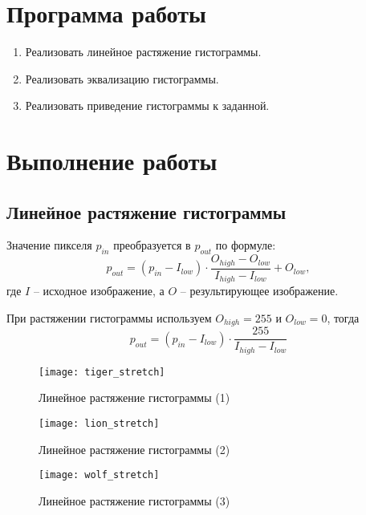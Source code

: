 





\tableofcontents
\newpage

\section{Программа работы}

\begin{enumerate}
	\item Реализовать линейное растяжение гистограммы.
	\item Реализовать эквализацию гистограммы.
	\item Реализовать приведение гистограммы к заданной.
\end{enumerate}

\section{Выполнение работы}

\subsection{Линейное растяжение гистограммы}

Значение пикселя $p_{in}$ преобразуется в $p_{out}$ по формуле:
$$
p_{out} = (p_{in} - I_{low}) \cdot \frac{O_{high} - O_{low}}{I_{high} - I_{low}} + O_{low},
$$
где $I$ -- исходное изображение, а $O$ -- результирующее изображение.

При растяжении гистограммы используем $O_{high} = 255$ и $O_{low} = 0$, тогда
$$
p_{out} = (p_{in} - I_{low}) \cdot \frac{255}{I_{high} - I_{low}}
$$

\begin{figure}[H]
	\centering
	\texttt{[image: tiger\_stretch]}
	\caption{Линейное растяжение гистограммы (1)}
\end{figure}

\begin{figure}[H]
	\centering
	\texttt{[image: lion\_stretch]}
	\caption{Линейное растяжение гистограммы (2)}
\end{figure}

\begin{figure}[H]
	\centering
	\texttt{[image: wolf\_stretch]}
	\caption{Линейное растяжение гистограммы (3)}
\end{figure}

